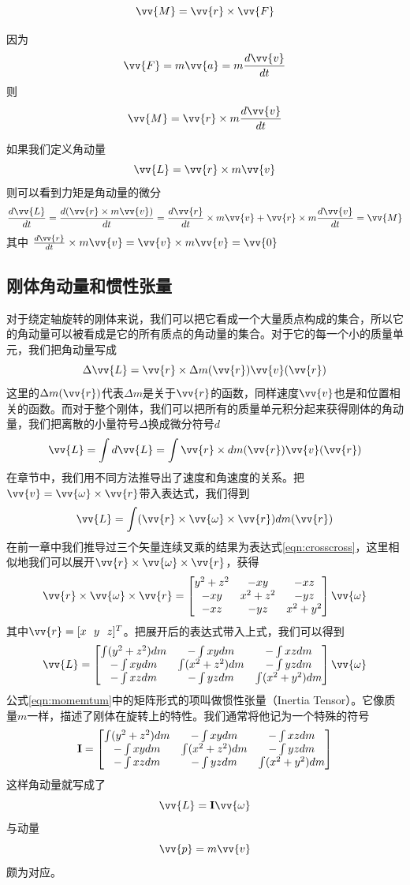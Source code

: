 \documentclass[11pt]{article}
\begin{document}
$$
\vv{M} = \vv{r} \times \vv{F}
$$

因为
$$
\vv{F} = m \vv{a} = m \frac{d\vv{v}}{dt}
$$
则
$$
\vv{M} = \vv{r} \times m \frac{d\vv{v}}{dt}
$$

如果我们定义角动量
$$
\vv{L} = \vv{r} \times m \vv{v}
$$
则可以看到力矩是角动量的微分
$$
\frac{d\vv{L}}{dt} = \frac{d(\vv{r} \times m \vv{v})}{dt} = \frac{d\vv{r}}{dt} \times m \vv{v} + \vv{r}\times m\frac{d\vv{v}}{dt} = \vv{M}
$$
其中
$
\frac{d\vv{r}}{dt} \times m \vv{v} = \vv{v} \times m \vv{v} = \vv{0} 
$
\subsection{刚体角动量和惯性张量}
对于绕定轴旋转的刚体来说，我们可以把它看成一个大量质点构成的集合，所以它的角动量可以被看成是它的所有质点的角动量的集合。对于它的每一个小的质量单元，我们把角动量写成
$$
\Delta \vv{L} = \vv{r} \times \Delta m(\vv{r}) \vv{v}(\vv{r})
$$
这里的$\Delta m(\vv{r})$代表$\Delta m$是关于$\vv{r}$的函数，同样速度$\vv{v}$也是和位置相关的函数。而对于整个刚体，我们可以把所有的质量单元积分起来获得刚体的角动量，我们把离散的小量符号$\Delta$换成微分符号$d$
$$
\vv{L} = \int d\vv{L} = \int \vv{r} \times dm(\vv{r}) \vv{v}(\vv{r})
$$
在章节\label{sec:angular}中，我们用不同方法推导出了速度和角速度的关系。把$\vv{v} = \vv{\omega}\times\vv{r}$带入表达式，我们得到
\begin{equation}
\vv{L} = \int (\vv{r} \times \vv{\omega}\times\vv{r}) dm(\vv{r})
\end{equation}
在前一章中我们推导过三个矢量连续叉乘的结果为表达式\ref{eqn:crosscross}，这里相似地我们可以展开$\vv{r} \times \vv{\omega}\times\vv{r}$，获得
$$
\vv{r} \times \vv{\omega}\times\vv{r} = 
\begin{bmatrix}
y^2+z^2	&	-xy		&	-xz	\\
-xy		&	x^2+z^2	&	-yz	\\
-xz		&	-yz		&	x^2+y^2
\end{bmatrix}\vv{\omega}
$$
其中$\vv{r} = [x \ \ y \ \ z]^T$。把展开后的表达式带入上式，我们可以得到
\begin{equation}\label{eqn:momemtum}
\vv{L} = 
\begin{bmatrix}
\int (y^2+z^2) dm	&	-\int xy dm		&	-\int xz dm	\\
-\int xy dm		&	\int (x^2+z^2) dm	&	-\int yz dm	\\
-\int xz dm		&	-\int yz dm		&	\int (x^2+y^2) dm
\end{bmatrix}\vv{\omega}
\end{equation}
公式\ref{eqn:momemtum}中的矩阵形式的项叫做惯性张量（Inertia Tensor）。它像质量$m$一样，描述了刚体在旋转上的特性。我们通常将他记为一个特殊的符号
$$
{\bf I} = 
\begin{bmatrix}
\int (y^2+z^2) dm	&	-\int xy dm		&	-\int xz dm	\\
-\int xy dm		&	\int (x^2+z^2) dm	&	-\int yz dm	\\
-\int xz dm		&	-\int yz dm		&	\int (x^2+y^2) dm
\end{bmatrix}
$$
这样角动量就写成了
$$
\vv{L} = {\bf I}\vv{\omega}
$$
与动量
$$
\vv{p} = m\vv{v}
$$
颇为对应。
\end{document}
